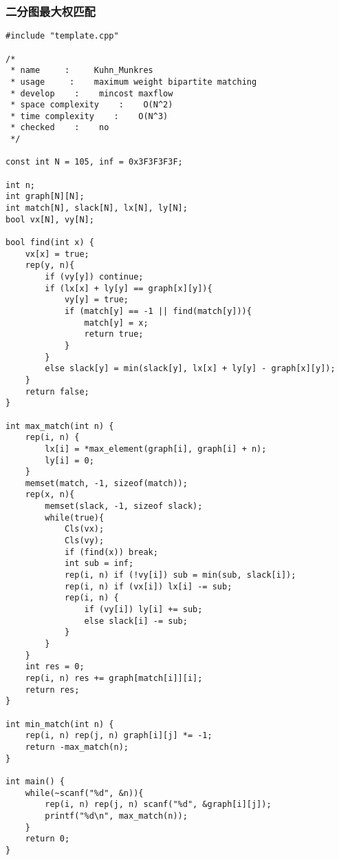\subsubsection{二分图最大权匹配}
\begin{verbatim}
#include "template.cpp" 

/*
 * name     :     Kuhn_Munkres
 * usage     :    maximum weight bipartite matching
 * develop    :    mincost maxflow 
 * space complexity    :    O(N^2)
 * time complexity    :    O(N^3)
 * checked    :    no
 */

const int N = 105, inf = 0x3F3F3F3F;

int n;
int graph[N][N];
int match[N], slack[N], lx[N], ly[N];
bool vx[N], vy[N];

bool find(int x) {
    vx[x] = true;
    rep(y, n){
        if (vy[y]) continue;
        if (lx[x] + ly[y] == graph[x][y]){
            vy[y] = true;
            if (match[y] == -1 || find(match[y])){
                match[y] = x;
                return true;
            }
        }
        else slack[y] = min(slack[y], lx[x] + ly[y] - graph[x][y]);
    }
    return false;
}

int max_match(int n) {
    rep(i, n) {
        lx[i] = *max_element(graph[i], graph[i] + n);
        ly[i] = 0;
    }
    memset(match, -1, sizeof(match));
    rep(x, n){
        memset(slack, -1, sizeof slack);
        while(true){
            Cls(vx);
            Cls(vy);
            if (find(x)) break;
            int sub = inf;
            rep(i, n) if (!vy[i]) sub = min(sub, slack[i]);
            rep(i, n) if (vx[i]) lx[i] -= sub;
            rep(i, n) {
                if (vy[i]) ly[i] += sub;
                else slack[i] -= sub;
            }
        }
    }
    int res = 0;
    rep(i, n) res += graph[match[i]][i];
    return res;
}

int min_match(int n) {
    rep(i, n) rep(j, n) graph[i][j] *= -1;
    return -max_match(n);
}

int main() {
    while(~scanf("%d", &n)){
        rep(i, n) rep(j, n) scanf("%d", &graph[i][j]);
        printf("%d\n", max_match(n));
    }
    return 0;
}
\end{verbatim}

